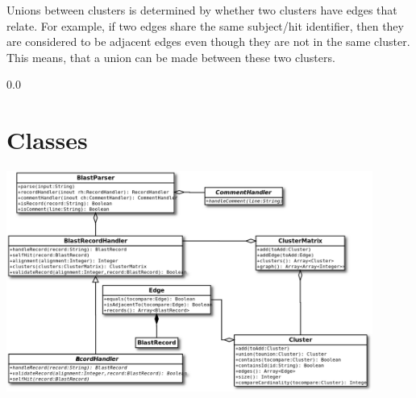 \documentclass[11pt,notitlepage]{article}
\begin{document}
  Unions between clusters is determined by whether two clusters have edges that relate. For example,
  if two edges share the same subject/hit identifier, then they are considered to be adjacent edges
  even though they are not in the same cluster. This means, that a union can be made between
  these two clusters.


  {\setlength{\baselineskip}%
           {0.0\baselineskip}
  \section*{\hfill Classes}
  \hrulefill \par}

  \includegraphics[width=120mm]{api/images/blast_clusters1_Class1.png}  

  
  
  
  
  
  
  
  
\end{document}
